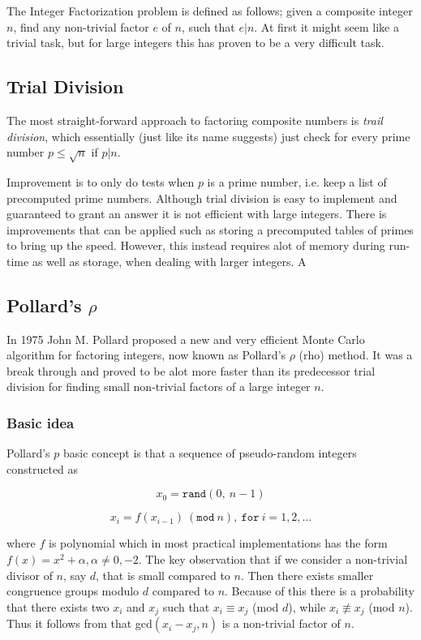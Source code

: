 The Integer Factorization problem is defined as follows; given a composite integer $n$, find any non-trivial factor $e$ of $n$, such that $e|n$. At first it might seem like a trivial task, but for large integers this has proven to be a very difficult task.

\subsection{Trial Division}
 The most straight-forward approach to factoring composite numbers is \emph{trail division}, which essentially (just like its name suggests) just check for every prime number $p \leq \sqrt{n}$ if $p|n$. 

Improvement is to only do tests when $p$ is a prime number, i.e. keep a list of precomputed prime numbers. Although trial division is easy to implement and guaranteed to grant an answer it is not efficient with large integers. There is improvements that can be applied such as storing a precomputed tables of primes to bring up the speed. However, this instead requires alot of memory during run-time as well as storage, when dealing with larger integers. A

\subsection{Pollard's $\rho$}
In 1975 John M. Pollard proposed a new and very efficient Monte Carlo algorithm for factoring integers, now known as Pollard's $\rho$ (rho) method.
It was a break through and proved to be alot more faster than its predecessor trial division for finding small non-trivial factors of a large integer $n$.

\subsubsection{Basic idea}
Pollard's $p$ basic concept is that a sequence of pseudo-random integers constructed as

\begin{equation}
x_0 = \texttt{rand}(0,\ n-1) 
\end{equation}

\begin{equation}
x_i = f(x_{i-1}) \ (\texttt{mod} \ n), \ \texttt{for} \ i = 1, 2, \ldots
\end{equation}

where $f$ is polynomial which in most practical implementations has the form $f(x) = x^2 + \alpha, \alpha \neq 0, -2$.
The key observation that if we consider a non-trivial divisor of $n$, say $d$, that is small compared to $n$. Then there exists smaller congruence
groups modulo $d$ compared to $n$. Because of this there is a probability that there exists two $x_i$ and $x_j$ such that $x_i \equiv x_j$ (mod $d$),
while $x_i \not\equiv x_j$ (mod $n$). Thus it follows from that gcd$(x_i - x_j, n)$ is a non-trivial factor of $n$.

